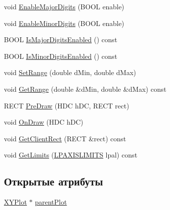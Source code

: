 \begin{DoxyCompactItemize}
\item 
void \hyperlink{class_axis_ae87d5b9b022bd8c885be4dc460c74a4a}{Enable\-Major\-Digits} (B\-O\-O\-L enable)
\item 
void \hyperlink{class_axis_ab6fc5e053579e7b6d5df8ffcb30a173f}{Enable\-Minor\-Digits} (B\-O\-O\-L enable)
\item 
B\-O\-O\-L \hyperlink{class_axis_ac3ad10e78c202f3d2f2e4c230a3c1fb3}{Is\-Major\-Digits\-Enabled} () const 
\item 
B\-O\-O\-L \hyperlink{class_axis_ab69ae039859200fce16725ea180fb829}{Is\-Minor\-Digits\-Enabled} () const 
\item 
void \hyperlink{class_axis_a41ec122237943357fc410f7e65541642}{Set\-Range} (double d\-Min, double d\-Max)
\item 
void \hyperlink{class_axis_ac64b96cb7b9a98cc4987caf370e1092c}{Get\-Range} (double \&d\-Min, double \&d\-Max) const 
\item 
R\-E\-C\-T \hyperlink{class_axis_a070bb4d5171d26d50a13f195f035476d}{Pre\-Draw} (H\-D\-C h\-D\-C, R\-E\-C\-T rect)
\item 
void \hyperlink{class_axis_a5120d60156ed20854085115bcfcab765}{On\-Draw} (H\-D\-C h\-D\-C)
\item 
void \hyperlink{class_axis_adff2ec412daaec9d055f0129e0a9117f}{Get\-Client\-Rect} (R\-E\-C\-T \&rect) const 
\item 
void \hyperlink{class_axis_a54b571ff70bfca89a515496c0ded3138}{Get\-Limits} (\hyperlink{_coord_converter_8h_aabd54ff6676737c3cae490e3a2363bc4}{L\-P\-A\-X\-I\-S\-L\-I\-M\-I\-T\-S} lpal) const 
\end{DoxyCompactItemize}
\subsection*{Открытые атрибуты}
\begin{DoxyCompactItemize}
\item 
\hyperlink{class_x_y_plot}{X\-Y\-Plot} $\ast$ \hyperlink{class_axis_a5bb30599723134e0d1250d6028a62575}{parent\-Plot}
\end{DoxyCompactItemize}
